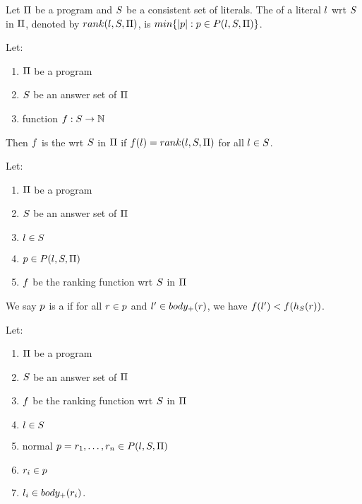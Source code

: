 \documentclass{paper}
\begin{document}
\begin{flushleft}
\begin{remark}
\end{remark}

\begin{definition}

Let $\Pi$ be a \hcf{} \ap{} program and
$S$ be a consistent set of literals.
The  of a literal $l$ wrt $S$ in $\Pi$,
denoted by $rank({l}, {S}, {\Pi})$, is
$min\{|p| : p \in P({l}, {S}, {\Pi})\}$.

\end{definition}

\begin{definition}

Let:
\begin{enumerate}
\item
$\Pi$ be a \hcf{} \ap{} program
\item
$S$ be an answer set of $\Pi$
\item
function $f : S \to \mathbb{N}$
\end{enumerate}

Then $f$ is the 
wrt $S$ in $\Pi$ if $f(l) = rank({l}, {S}, {\Pi})$
for all $l \in S$.

\end{definition}

\begin{definition}

Let:
\begin{enumerate}
\item
$\Pi$ be a \hcf{} \ap{} program
\item
$S$ be an answer set of $\Pi$
\item
$l \in S$
\item
$p \in P({l}, {S}, {\Pi})$
\item
$f$ be the ranking function wrt $S$ in $\Pi$
\end{enumerate}

We say $p$ is a  if
for all $r \in p$ and ${l}' \in body_+(r)$,
we have $f({l}') < f(h_S(r))$.

\end{definition}

\begin{remark}

Let:
\begin{enumerate}
\item
$\Pi$ be a \hcf{} \ap{} program
\item
$S$ be an answer set of $\Pi$
\item
$f$ be the ranking function wrt $S$ in $\Pi$
\item
$l \in S$
\item
normal $p = {r}_{1}, \ldots, {r}_{n} \in P({l}, {S}, {\Pi})$
\item
${r}_{i} \in p$
\item
${l}_{i} \in body_+({r}_{i})$.
\end{enumerate}


\end{remark}
\end{flushleft}
\end{document}
